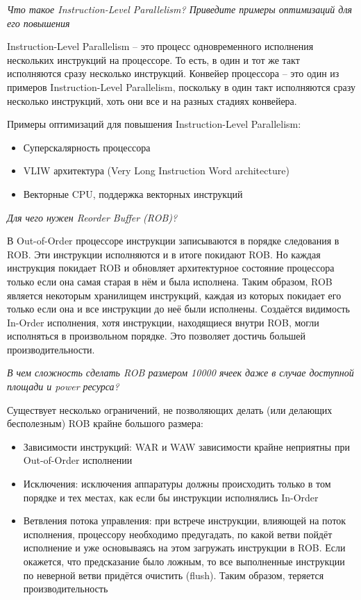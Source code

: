 	\textit{Что такое Instruction-Level Parallelism? Приведите примеры оптимизаций для его повышения}
	
	Instruction-Level Parallelism -- это процесс одновременного исполнения нескольких инструкций на процессоре. То есть, в один и тот же такт исполняются сразу несколько инструкций. Конвейер процессора -- это один из примеров Instruction-Level Parallelism, поскольку в один такт исполняются сразу несколько инструкций, хоть они все и на разных стадиях конвейера.
	
	Примеры оптимизаций для повышения Instruction-Level Parallelism:
	\begin{itemize}
		\item Суперскалярность процессора
		\item VLIW архитектура (Very Long Instruction Word architecture)
		\item Векторные CPU, поддержка векторных инструкций
	\end{itemize}
	
	\newpage
	
	\textit{Для чего нужен Reorder Buffer (ROB)?}
	
	В Out-of-Order процессоре инструкции записываются в порядке следования в ROB. Эти инструкции исполняются и в итоге покидают ROB. Но каждая инструкция покидает ROB и обновляет архитектурное состояние процессора только если она самая старая в нём и была исполнена. Таким образом, ROB является некоторым хранилищем инструкций, каждая из которых покидает его только если она и все инструкции до неё были исполнены. Создаётся видимость In-Order исполнения, хотя инструкции, находящиеся внутри ROB, могли исполняться в произвольном порядке. Это позволяет достичь большей производительности.
	
	\textit{В чем сложность сделать ROB размером 10000 ячеек даже в случае доступной площади и power ресурса?}
	
	Существует несколько ограничений, не позволяющих делать (или делающих бесполезным) ROB крайне большого размера:
	\begin{itemize}
		\item Зависимости инструкций: WAR и WAW зависимости крайне неприятны при Out-of-Order исполнении
		\item Исключения: исключения аппаратуры должны происходить только в том порядке и тех местах, как если бы инструкции исполнялись In-Order
		\item Ветвления потока управления: при встрече инструкции, влияющей на поток исполнения, процессору необходимо предугадать, по какой ветви пойдёт исполнение и уже основываясь на этом загружать инструкции в ROB. Если окажется, что предсказание было ложным, то все выполненные инструкции по неверной ветви придётся очистить (flush). Таким образом, теряется производительность
	\end{itemize}
	
